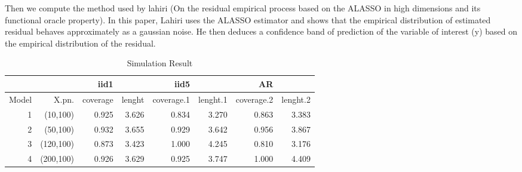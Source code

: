 \documentclass[11pt,oneside, a4paper]{amsart}\usepackage[]{graphicx}\usepackage[]{color}
\begin{document}
\begin{table}[ht]
\centering
\caption{Simulation Result} 
\label{Test_table}
{\footnotesize
{}
}
\end{table}




Then we compute the method used by lahiri (On the residual empirical process based on the ALASSO in high dimensions and its functional oracle property). In this paper, Lahiri uses the ALASSO estimator and shows that the empirical distribution of estimated residual behaves approximately as a gaussian noise. He then deduces a confidence band of prediction of the variable of interest (y) based on the empirical distribution of the residual.





\begin{table}[ht]
\centering
\caption{Simulation Result} 
\label{Test_table}
{\footnotesize
\begin{tabular}{|r|r|rr|rr|rr|}
  \toprule 
    &  & iid1 &  & iid5 & & AR & \\
 \midrule 
Model & X.pn. & coverage & lenght & coverage.1 & lenght.1 & coverage.2 & lenght.2 \\ 
    1 & (10,100) & 0.925 & 3.626 & 0.834 & 3.270 & 0.863 & 3.383 \\ 
     2 & (50,100) & 0.932 & 3.655 & 0.929 & 3.642 & 0.956 & 3.867 \\ 
     3 & (120,100) & 0.873 & 3.423 & 1.000 & 4.245 & 0.810 & 3.176 \\ 
     4 & (200,100) & 0.926 & 3.629 & 0.925 & 3.747 & 1.000 & 4.409 \\ 
   \bottomrule 
\end{tabular}
}
\end{table}
\end{document}
